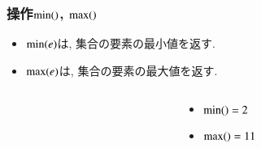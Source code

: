 \documentclass[main]{subfiles}
\begin{document}
\begin{frame}\frametitle{操作$\mathrm{min}()$, $\mathrm{max}()$}
\begin{itemize}
	\item $\mathrm{min}(e)$は, 集合の要素の最小値を返す.\\
	\item $\mathrm{max}(e)$は, 集合の要素の最大値を返す.\\
\end{itemize}

\begin{columns}[c]
	\begin{column}{0.5\linewidth}
		
	\end{column}
	\begin{column}{0.49\linewidth}
		\begin{itemize}
			\item $\mathrm{min}() = 2$\\
			\item $\mathrm{max}() = 11$\\
		\end{itemize}
	\end{column}
\end{columns}
\end{frame}
\end{document}
